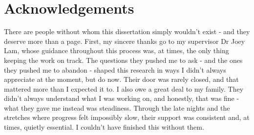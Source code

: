 
\chapter*{Acknowledgements}

There are people without whom this dissertation simply wouldn't exist - and they deserve more than a page.
First, my sincere thanks go to my supervisor Dr Joey Lam, whose guidance throughout this process was, at times, the only thing keeping the work on track. The questions they pushed me to ask - and the ones they pushed me to abandon - shaped this research in ways I didn't always appreciate at the moment, but do now. Their door was rarely closed, and that mattered more than I expected it to.
I also owe a great deal to my family. They didn't always understand what I was working on, and honestly, that was fine - what they gave me instead was steadiness. Through the late nights and the stretches where progress felt impossibly slow, their support was consistent and, at times, quietly essential. I couldn't have finished this without them.

